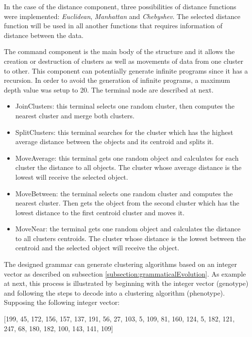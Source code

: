 \documentclass[journal]{IEEEtran}
\begin{document}
	In the case of the distance component, three possibilities of distance functions were implemented: \textit{Euclidean}, \textit{Manhattan} and \textit{Chebyshev}. The selected distance function will be used in all another functions that requires information of distance between the data. 
	
	The command component is the main body of the structure and it allows the creation or destruction of clusters as well as movements of data from one cluster to other.  This component can potentially generate infinite programs since it has a recursion. In order to avoid the generation of infinite programs, a maximum depth value was setup to 20. The  terminal node are described at next.
	
	\begin{itemize}
		\item JoinClusters: this terminal selects one random cluster, then computes the nearest cluster and merge both clusters.
		\item SplitClusters: this terminal searches for the cluster which has the highest average distance between the objects and its centroid and splits it. 
		\item MoveAverage:  this terminal gets one random object and calculates for each cluster the distance to all objects. The cluster whose average distance is the lowest will receive the 
		selected object.
		\item MoveBetween: the terminal selects one random cluster and computes the nearest cluster. Then gets the object from the second cluster which has the lowest distance to the first centroid cluster and moves it.
		\item MoveNear:  the terminal gets one random object and calculates the distance to all clusters centroids. The cluster whose distance is the lowest between the centroid and the selected object will receive the object.
	\end{itemize}
	
	The designed grammar can generate clustering algorithms based on an integer vector as described on subsection \ref{subsection:grammaticalEvolution}. As example at next, this process is illustrated by beginning with the integer vector (genotype) and following the steps to decode into a clustering algorithm (phenotype). 
	Supposing the following integer vector:
	
	[199, 45, 172, 156, 157, 137, 191, 56, 27, 103, 5, 109, 81, 160, 124, 5, 182, 121, 247, 68, 180, 182, 100, 143, 141, 109]
	
\end{document}
